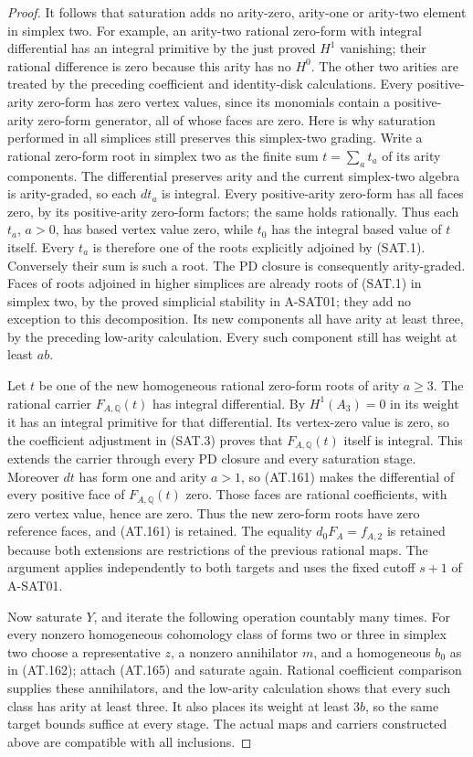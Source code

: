 \begin{proof}
It follows that saturation adds no arity-zero,
arity-one or arity-two element in simplex two.
For example, an arity-two rational zero-form with
integral differential has an integral primitive
by the just proved $H^1$ vanishing; their rational
difference is zero because this arity has no $H^0$.
The other two arities are treated by the preceding
coefficient and identity-disk calculations.
Every positive-arity zero-form has zero vertex
values, since its monomials contain a positive-arity
zero-form generator, all of whose faces are zero.
Here is why saturation performed in all simplices
still preserves this simplex-two grading.
Write a rational zero-form root in simplex two as
the finite sum $t=\sum_a t_a$ of its arity components.
The differential preserves arity and the current
simplex-two algebra is arity-graded, so each $dt_a$
is integral. Every positive-arity zero-form has all
faces zero, by its positive-arity zero-form factors;
the same holds rationally. Thus each $t_a$, $a>0$,
has based vertex value zero, while $t_0$ has the
integral based value of $t$ itself.
Every $t_a$ is therefore one of the roots explicitly
adjoined by (SAT.1). Conversely their sum is such
a root. The PD closure is consequently arity-graded.
Faces of roots adjoined in higher simplices are
already roots of (SAT.1) in simplex two, by the
proved simplicial stability in A-SAT01; they add no
exception to this decomposition.
Its new components all have arity at least three,
by the preceding low-arity calculation.
Every such component still has weight at least $ab$.

Let $t$ be one of the new homogeneous rational
zero-form roots of arity $a\geq3$.
The rational carrier $F_{A,\mathbb Q}(t)$ has
integral differential. By $H^1(A_3)=0$ in its
weight it has an integral primitive for that
differential. Its vertex-zero value is zero, so
the coefficient adjustment in (SAT.3) proves
that $F_{A,\mathbb Q}(t)$ itself is integral.
This extends the carrier through every PD
closure and every saturation stage.
Moreover $dt$ has form one and arity $a>1$,
so (AT.161) makes the differential of every
positive face of $F_{A,\mathbb Q}(t)$ zero.
Those faces are rational coefficients, with
zero vertex value, hence are zero.
Thus the new zero-form roots have zero reference
faces, and (AT.161) is retained.
The equality $d_0F_A=f_{A,2}$ is retained because
both extensions are restrictions of the previous
rational maps. The argument applies independently
to both targets and uses the fixed cutoff $s+1$
of A-SAT01.

Now saturate $Y$, and iterate the following
operation countably many times.
For every nonzero homogeneous cohomology class
of forms two or three in simplex two choose
a representative $z$, a nonzero annihilator $m$,
and a homogeneous $b_0$ as in (AT.162); attach
(AT.165) and saturate again.
Rational coefficient comparison supplies these
annihilators, and the low-arity calculation shows
that every such class has arity at least three.
It also places its weight at least $3b$, so the
same target bounds suffice at every stage.
The actual maps and carriers constructed above
are compatible with all inclusions.


\end{proof}

